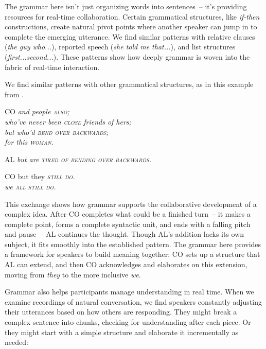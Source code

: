 The grammar here isn't just organizing words into sentences~-- it's providing resources for real-time collaboration. Certain grammatical structures, like \textit{if-then} constructions, create natural pivot points where another speaker can jump in to complete the emerging utterance. We find similar patterns with relative clauses (\textit{the guy who...}), reported speech (\textit{she told me that...}), and list structures (\textit{first...second...}). These patterns show how deeply grammar is woven into the fabric of real-time interaction.

We find similar patterns with other grammatical structures, as in this example from \citet{szczepek2000}. 

\ea 
\begin{dialogue}
    \item[CO] \textit{and people \textsc{also};} \\
    \textit{who've never been \textsc{close} friends of hers;} \\
    \textit{but who'd \textsc{bend over backwards};} \\
    \textit{for this \textsc{woman.}}
    \item[AL] \textit{but are \textsc{tired of bending over backwards.}}
    \item[CO] but they \textsc{\textit{still do.}} \\
    \textit{we \textsc{all still do.}}
\end{dialogue}
\z

This exchange shows how grammar supports the collaborative development of a complex idea. After CO completes what could be a finished turn~-- it makes a complete point, forms a complete syntactic unit, and ends with a falling pitch and pause~-- AL continues the thought. Though AL's addition lacks its own subject, it fits smoothly into the established pattern. The grammar here provides a framework for speakers to build meaning together: CO sets up a structure that AL can extend, and then CO acknowledges and elaborates on this extension, moving from \textit{they} to the more inclusive \textit{we}.

Grammar also helps participants manage understanding in real time. When we examine recordings of natural conversation, we find speakers constantly adjusting their utterances based on how others are responding. They might break a complex sentence into chunks, checking for understanding after each piece. Or they might start with a simple structure and elaborate it incrementally as needed:

